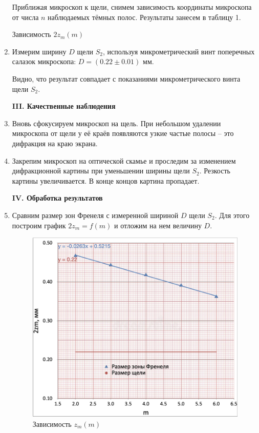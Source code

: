 \documentclass[12pt,a4paper]{article}
\begin{document}
\begin{enumerate}
		Приближая микроскоп к щели, снимем зависимость координаты микроскопа от числа $n$ наблюдаемых тёмных полос. Результаты занесем в таблицу 1.
		
        \begin{table}[H]
    	   \centering
    	   \footnotesize
    	   
    	   \caption{Зависимость $2z_m(m)$}
    	   \label{tab:t1}
        \end{table}
	
		\item Измерим ширину $D$ щели $S_2$, используя микрометрический винт поперечных салазок микроскопа: $D = (0.22 \pm 0.01)$ мм.
		
		Видно, что результат совпадает с показаниями микрометрического винта щели $S_2$.
		
		
		\begin{center}
			\textbf{III. Качественные наблюдения}
		\end{center}
		
		\item Вновь сфокусируем микроскоп на щель. При небольшом удалении микроскопа от щели у её краёв появляются узкие частые полосы -- это дифракция на краю экрана.
		
		\item Закрепим микроскоп на оптической скамье и проследим за изменением дифракционной картины при уменьшении ширины щели $S_2$. Резкость картины увеличивается. В конце концов картина пропадает.
		
		
		
		\begin{center}
			\textbf{IV. Обработка результатов}
		\end{center}
		
		\item Сравним размер зон Френеля с измеренной шириной $D$ щели $S_2$. Для этого  построим график $2z_m = f(m)$ и отложим на нем величину $D$.
		\begin{figure}[h!]
			\centering
			\includegraphics[scale=0.65]{src/z(m)}
			\caption{Зависимость $z_m(m)$}
		\end{figure}
		

\end{enumerate}
\end{document}
